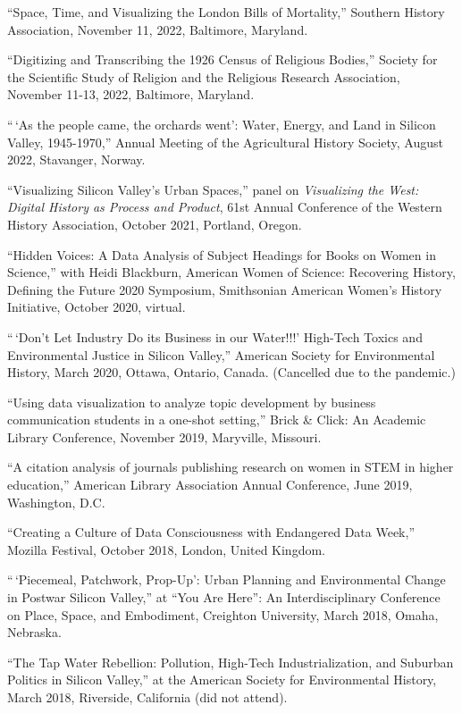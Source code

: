 ``Space, Time, and Visualizing the London Bills of Mortality,'' Southern
History Association, November 11, 2022, Baltimore, Maryland.

``Digitizing and Transcribing the 1926 Census of Religious Bodies,''
Society for the Scientific Study of Religion and the Religious Research
Association, November 11-13, 2022, Baltimore, Maryland.

``\,`As the people came, the orchards went': Water, Energy, and Land in
Silicon Valley, 1945-1970,'' Annual Meeting of the Agricultural History
Society, August 2022, Stavanger, Norway.

``Visualizing Silicon Valley's Urban Spaces,'' panel on
\emph{Visualizing the West: Digital History as Process and Product},
61st Annual Conference of the Western History Association, October 2021,
Portland, Oregon.

``Hidden Voices: A Data Analysis of Subject Headings for Books on Women
in Science,'' with Heidi Blackburn, American Women of Science:
Recovering History, Defining the Future 2020 Symposium, Smithsonian
American Women's History Initiative, October 2020, virtual.

``\,`Don't Let Industry Do its Business in our Water!!!' High-Tech
Toxics and Environmental Justice in Silicon Valley,'' American Society
for Environmental History, March 2020, Ottawa, Ontario, Canada.
(Cancelled due to the pandemic.)

``Using data visualization to analyze topic development by business
communication students in a one-shot setting,'' Brick \& Click: An
Academic Library Conference, November 2019, Maryville, Missouri.

``A citation analysis of journals publishing research on women in STEM
in higher education,'' American Library Association Annual Conference,
June 2019, Washington, D.C.

``Creating a Culture of Data Consciousness with Endangered Data Week,''
Mozilla Festival, October 2018, London, United Kingdom.

``\,`Piecemeal, Patchwork, Prop-Up': Urban Planning and Environmental
Change in Postwar Silicon Valley,'' at ``You Are Here'': An
Interdisciplinary Conference on Place, Space, and Embodiment, Creighton
University, March 2018, Omaha, Nebraska.

``The Tap Water Rebellion: Pollution, High-Tech Industrialization, and
Suburban Politics in Silicon Valley,'' at the American Society for
Environmental History, March 2018, Riverside, California (did not
attend).

